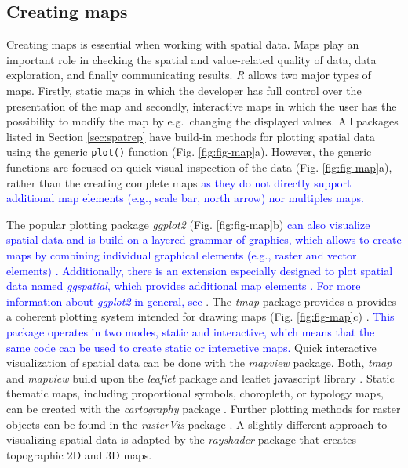 \documentclass[smallextended]{svjour3}       %
\begin{document}
\hypertarget{creating-maps}{%
\subsection{Creating maps}\label{creating-maps}}

Creating maps is essential when working with spatial data.
Maps play an important role in checking the spatial and value-related quality of data, data exploration, and finally communicating results.
\textit{R} allows two major types of maps.
Firstly, static maps in which the developer has full control over the presentation of the map and secondly, interactive maps in which the user has the possibility to modify the map by e.g.~changing the displayed values.
All packages listed in Section \ref{sec:spatrep} have build-in methods for plotting spatial data using the generic \texttt{plot()} function (Fig. \ref{fig:fig-map}a).
However, the generic functions are focused on quick visual inspection of the data (Fig. \ref{fig:fig-map}a), rather than the creating complete maps \textcolor{blue}{as they do not directly support additional map elements (e.g., scale bar, north arrow) nor multiples maps.}

The popular plotting package \textit{ggplot2} (Fig. \ref{fig:fig-map}b) \textcolor{blue}{can also visualize spatial data and is build on a layered grammar of graphics, which allows to create maps by combining individual graphical elements (e.g., raster and vector elements) \cite{Wickham2016}.
Additionally, there is an extension especially designed to plot spatial data named \textit{ggspatial}, which provides additional map elements \cite{Dunnington2020}.
For more information about \textit{ggplot2} in general, see \cite{Wickham2016}}.
The \textit{tmap} package provides a provides a coherent plotting system intended for drawing maps (Fig. \ref{fig:fig-map}c) \cite{Tennekes2018}.
\textcolor{blue}{This package operates in two modes, static and interactive, which means that the same code can be used to create static or interactive maps.}
Quick interactive visualization of spatial data can be done with the \textit{mapview} package\cite{Appelhans2020}.
Both, \textit{tmap} and \textit{mapview} build upon the \textit{leaflet} package and leaflet javascript library \cite{Cheng2021}.
Static thematic maps, including proportional symbols, choropleth, or typology maps, can be created with the \textit{cartography} package \cite{Giraud2016}.
Further plotting methods for raster objects can be found in the \textit{rasterVis} package \cite{Lamigueiro2020}.
A slightly different approach to visualizing spatial data is adapted by the \textit{rayshader} package \cite{Morgen-Wall2020} that creates topographic 2D and 3D maps.
\end{document}
